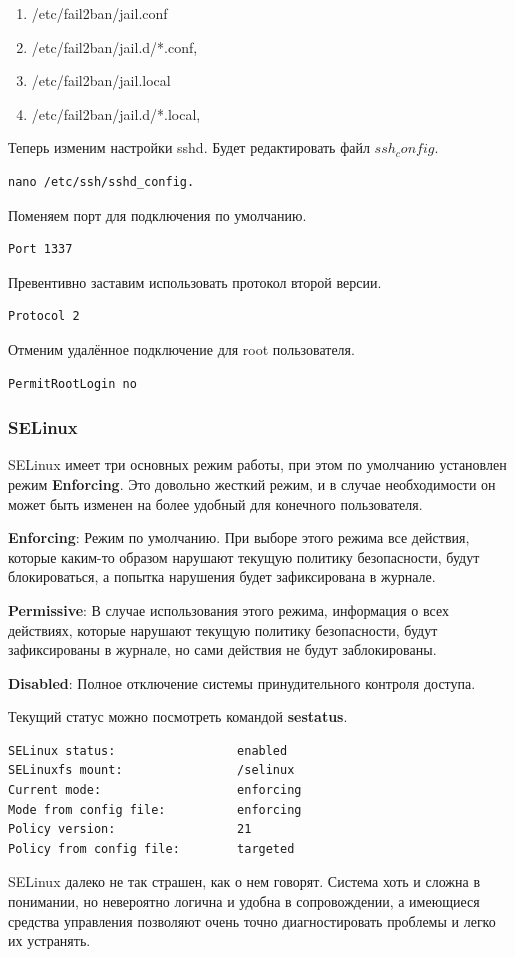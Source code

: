 \begin{enumerate}
	\item /etc/fail2ban/jail.conf
	\item 	/etc/fail2ban/jail.d/*.conf,
	\item 	/etc/fail2ban/jail.local
	\item 	/etc/fail2ban/jail.d/*.local,
\end{enumerate}

Теперь изменим настройки sshd. 
Будет редактировать файл $ssh_config$.
\begin{lstlisting}
nano /etc/ssh/sshd_config.
\end{lstlisting}

Поменяем порт для подключения по умолчанию.

\begin{lstlisting}
Port 1337
\end{lstlisting}

Превентивно заставим использовать протокол второй версии.

\begin{lstlisting}
Protocol 2
\end{lstlisting}

Отменим удалённое подключение для root пользователя.

\begin{lstlisting}
PermitRootLogin no
\end{lstlisting}

\subsubsection{SELinux}

SELinux имеет три основных режим работы, при этом по умолчанию установлен режим
\textbf{Enforcing}. Это довольно жесткий режим, и в случае необходимости он может быть изменен на более удобный для конечного пользователя.

\textbf{Enforcing}: Режим по умолчанию. При выборе этого режима все действия, которые каким-то образом нарушают текущую политику безопасности, будут блокироваться, а попытка нарушения будет зафиксирована в журнале.

\textbf{Permissive}: В случае использования этого режима, информация о всех действиях, которые нарушают текущую политику безопасности, будут зафиксированы в журнале, но сами действия не будут заблокированы.

\textbf{Disabled}: Полное отключение системы принудительного контроля доступа.

Текущий статус можно посмотреть командой \textbf{sestatus}.

\begin{lstlisting}
SELinux status:                 enabled
SELinuxfs mount:                /selinux
Current mode:                   enforcing
Mode from config file:          enforcing
Policy version:                 21
Policy from config file:        targeted
\end{lstlisting}

SELinux далеко не так страшен, как о нем говорят. Система хоть и сложна в понимании, но невероятно логична и удобна в сопровождении, а имеющиеся средства управления позволяют очень точно диагностировать проблемы и легко их устранять.
